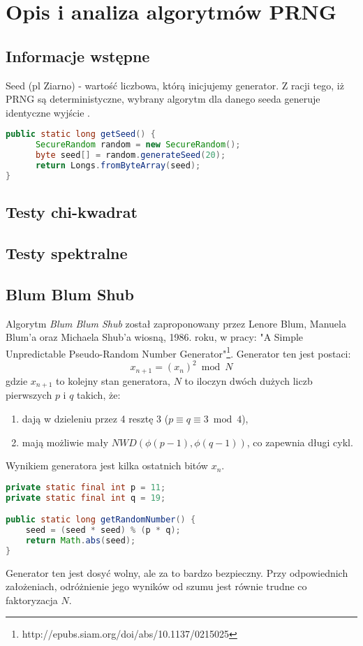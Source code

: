 \documentclass[a4paper, 11pt]{article} %
\begin{document}
\section{Opis i analiza algorytmów PRNG}
\subsection*{Informacje wstępne}
Seed (pl Ziarno) - wartość liczbowa, którą inicjujemy generator. Z racji tego, iż PRNG są deterministyczne, wybrany algorytm dla danego seeda generuje identyczne wyjście	. 
\begin{lstlisting}[style=mystyle, language=java, frame=single]
public static long getSeed() {
      SecureRandom random = new SecureRandom();
      byte seed[] = random.generateSeed(20);
      return Longs.fromByteArray(seed);
}
\end{lstlisting}
\subsection*{Testy chi-kwadrat}
\subsection*{Testy spektralne}

\subsection{Blum Blum Shub}
Algorytm \textit{Blum Blum Shub} został zaproponowany przez Lenore Blum, Manuela Blum'a oraz Michaela Shub'a wiosną, 1986. roku, w pracy: "A Simple Unpredictable Pseudo-Random Number Generator"\footnote{http://epubs.siam.org/doi/abs/10.1137/0215025}. Generator ten jest postaci:
\[ x_{n+1} = (x_{n})^2 \bmod N \]
gdzie $x_{n+1}$ to kolejny stan generatora, $N$ to iloczyn dwóch dużych liczb pierwszych $p$ i $q$ takich, że:
\begin{enumerate}
\item dają w dzieleniu przez 4 resztę 3 ($p\equiv q \equiv 3 \bmod 4$),
\item mają możliwie mały $NWD(\phi(p-1), \phi(q-1))$, co zapewnia długi cykl.
\end{enumerate}
Wynikiem generatora jest kilka ostatnich bitów $x_{n}$.
\begin{lstlisting}[style=mystyle, language=java, frame=single]
private static final int p = 11;
private static final int q = 19;

public static long getRandomNumber() {
    seed = (seed * seed) % (p * q);
    return Math.abs(seed);
}
\end{lstlisting}
Generator ten jest dosyć wolny, ale za to bardzo bezpieczny. Przy odpowiednich założeniach, odróżnienie jego wyników od szumu jest równie trudne co faktoryzacja $N$.
\end{document}
